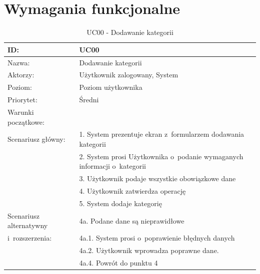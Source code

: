 \section{Wymagania funkcjonalne}

\begin{table}[H]
    \begin{tabular}{|p{5cm}|p{9cm}|}\hline
	ID: & UC00 \\\hline
    Nazwa: & Dodawanie kategorii \\\hline
    Aktorzy: & Użytkownik zalogowany, System \\\hline
    Poziom: & Poziom użytkownika  \\\hline
    Priorytet: & Średni \\\hline
    Warunki początkowe: & ~ \\\hline
    Scenariusz główny: & 1. System prezentuje ekran z~formularzem dodawania kategorii \\
    ~ & 2. System prosi Użytkownika o~podanie wymaganych informacji o~kategorii \\
    ~ & 3. Użytkownik podaje wszystkie obowiązkowe dane \\
    ~ & 4. Użytkownik zatwierdza operację \\
    ~ & 5. System dodaje kategorię \\\hline
    Scenariusz alternatywny & 4a. Podane dane są nieprawidłowe \\
    i~rozszerzenia: & 4a.1. System prosi o~poprawienie błędnych danych \\
    ~ & 4a.2. Użytkownik wprowadza poprawne dane. \\
    ~ & 4a.4. Powrót do punktu 4 \\
    \hline\end{tabular}
	\caption{UC00 - Dodawanie kategorii}
\end{table}

